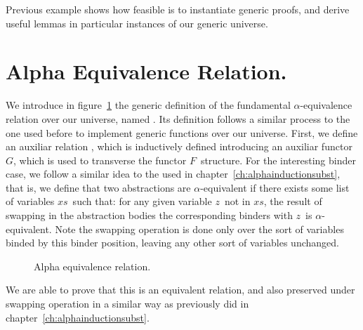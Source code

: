 \documentclass{book}
\newcommand{\alp}{\ensuremath{\alpha}}
\begin{document}


  


Previous example shows how feasible is to instantiate generic proofs, and derive useful lemmas in particular instances of our generic universe. 

\section{Alpha Equivalence Relation.} \label{sec:alpha}

We introduce in figure~\ref{fig:alpha} the generic definition of the fundamental \alp-equivalence relation over our universe, named . Its definition follows a similar process to the one used before to implement generic functions over our universe. First, we define an auxiliar relation , which is inductively defined introducing an auxiliar functor $G$, which is used to transverse the functor $F$\ structure. For the interesting binder case, we follow a similar idea to the used in chapter~\ref{ch:alphainductionsubst}, that is, we define that two abstractions are \alp-equivalent if there exists some list of variables $xs$\ such that: for any given variable $z$\ not in $xs$, the result of swapping in the abstraction bodies the corresponding binders with $z$\ is \alp-equivalent. Note the swapping operation is done only over the sort of variables binded by this binder position, leaving any other sort of variables unchanged.

\begin{figure}[h]
  \caption{Alpha equivalence relation.}
\label{fig:alpha}
\end{figure}

We are able to prove that this is an equivalent relation, and also preserved under swapping operation in a similar way as previously did in chapter~\ref{ch:alphainductionsubst}.
\end{document}
